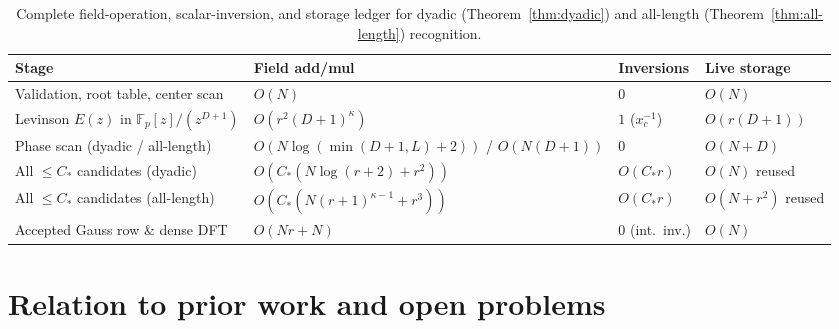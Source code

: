\documentclass[11pt,reqno]{amsart}
\numberwithin{equation}{section}
\theoremstyle{definition}
\theoremstyle{remark}
\newcommand{\F}{\mathbb{F}}
\begin{document}
\begin{table}[ht]
\centering
\caption{Complete field-operation, scalar-inversion, and storage ledger for dyadic (Theorem~\ref{thm:dyadic}) and all-length (Theorem~\ref{thm:all-length}) recognition.}
\label{tab:ledger}
\begin{tabular}{llll}
\toprule
Stage & Field add/mul & Inversions & Live storage \\
\midrule
Validation, root table, center scan & $O(N)$ & $0$ & $O(N)$ \\
Levinson $E(z)$ in $\F_p[z]/(z^{D+1})$ & $O(r^2(D+1)^\kappa)$ & $1$ ($x_c^{-1}$) & $O(r(D+1))$ \\
Phase scan (dyadic / all-length) & $O(N\log(\min(D+1,L)+2))$ / $O(N(D+1))$ & $0$ & $O(N + D)$ \\
All $\le C_*$ candidates (dyadic) & $O(C_*(N\log(r+2)+r^2))$ & $O(C_* r)$ & $O(N)$ reused \\
All $\le C_*$ candidates (all-length) & $O(C_*(N(r+1)^{\kappa-1}+r^3))$ & $O(C_* r)$ & $O(N+r^2)$ reused \\
Accepted Gauss row \& dense DFT & $O(Nr + N)$ & $0$ (int.\ inv.) & $O(N)$ \\
\bottomrule
\end{tabular}
\end{table}

\section{Relation to prior work and open problems}
\label{sec:prior}
\end{document}
